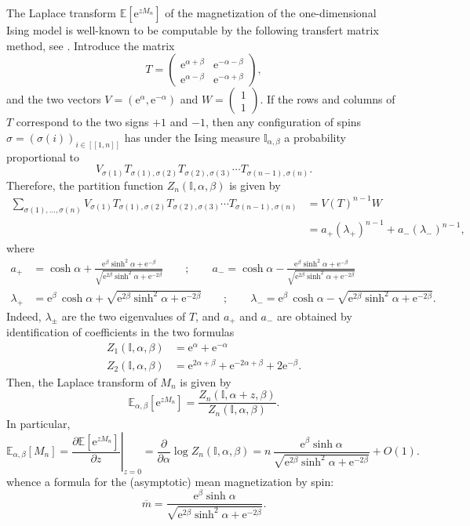 \documentclass[12pt,a4paper,reqno]{amsart}
\newcommand{\E}{\mathrm{e}}
\newcommand{\esper}{\mathbb{E}}
\newcommand{\IS}{\mathbb{I}}
\newcommand{\lle}{\left[\!\left[}
\newcommand{\rre}{\right]\!\right]}
\theoremstyle{remark}
\begin{document}
 The Laplace transform $\esper[\E^{zM_n}]$ of the magnetization of the one-dimensional Ising model is well-known to be computable by the following transfert matrix method, see \cite[Chapter 2]{Bax82}. Introduce the matrix
$$T=\begin{pmatrix}
\E^{\alpha+\beta} & \E^{-\alpha-\beta} \\
\E^{\alpha-\beta} & \E^{-\alpha+\beta}
\end{pmatrix}, $$
and the two vectors $V=(\E^{\alpha},\E^{-\alpha})$ and $W=(\begin{smallmatrix}1 \\ 1\end{smallmatrix})$. If the rows and columns of $T$ correspond to the two signs $+1$ and $-1$, then any configuration of spins $\sigma=(\sigma(i))_{i \in \lle 1,n\rre}$ has under the Ising measure $\IS_{\alpha,\beta}$ a probability proportional to 
$$V_{\sigma(1)}T_{\sigma(1),\sigma(2)}T_{\sigma(2),\sigma(3)}\cdots T_{\sigma(n-1),\sigma(n)}.$$
Therefore, the partition function $Z_n(\IS,\alpha,\beta)$ is given by
\begin{align*}
\sum_{\sigma(1),\ldots ,\sigma(n)} V_{\sigma(1)}T_{\sigma(1),\sigma(2)}T_{\sigma(2),\sigma(3)}\cdots T_{\sigma(n-1),\sigma(n)} &= V(T)^{n-1}W\\
&=a_+(\lambda_+)^{n-1}+a_-(\lambda_-)^{n-1},
\end{align*}
where 
\begin{align*}
a_+ &= \cosh \alpha + \frac{\E^{\beta}\sinh^2\alpha + \E^{-\beta}}{\sqrt{\E^{2\beta}\sinh^2\alpha + \E^{-2\beta}}}\qquad;\qquad a_-= \cosh \alpha - \frac{\E^{\beta}\sinh^2\alpha + \E^{-\beta}}{\sqrt{\E^{2\beta}\sinh^2\alpha + \E^{-2\beta}}}\\
\lambda_+ &=\E^{\beta}\,\cosh \alpha + \sqrt{\E^{2\beta} \sinh^2\alpha + \E^{-2\beta} }\qquad;\qquad \lambda_- =\E^{\beta}\,\cosh \alpha - \sqrt{\E^{2\beta} \sinh^2\alpha + \E^{-2\beta} }.
\end{align*}
Indeed, $\lambda_{\pm}$ are the two eigenvalues of $T$, and $a_+$ and $a_-$ are obtained by identification of coefficients in the two formulas \begin{align*}
Z_1(\IS,\alpha,\beta)&=\E^{\alpha}+\E^{-\alpha}\\
Z_2(\IS,\alpha,\beta)&=\E^{2\alpha+\beta}+\E^{-2\alpha+\beta} + 2\E^{-\beta}. 
 \end{align*}
Then, the Laplace transform of $M_n$ is given by 
$$\esper_{\alpha,\beta}[\E^{zM_n}]=\frac{Z_n(\IS,\alpha+z,\beta)}{Z_n(\IS,\alpha,\beta)}.$$
In particular, 
$$
\esper_{\alpha,\beta}[M_n]=\left.\frac{\partial \esper[\E^{zM_n}]}{\partial z}\right|_{z=0} = \frac{\partial }{\partial \alpha} \log Z_n(\IS,\alpha,\beta)= n \,\frac{\E^{\beta}\sinh\alpha }{\sqrt{\E^{2\beta}\sinh^2 \alpha+\E^{-2\beta}}}+O(1).
$$
whence a formula for the (asymptotic) mean magnetization by spin: $$\overline{m}=\frac{\E^{\beta}\sinh\alpha}{\sqrt{\E^{2\beta} \sinh^2 \alpha + \E^{-2\beta}}}.$$\bigskip
\end{document}

